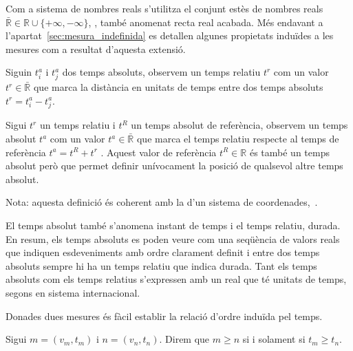 Com a sistema de nombres reals s'utilitza el conjunt estès de nombres reals $\bar{\mathbb{R}} \in \mathbb{R} \cup \{+\infty,-\infty\}$, \cite{wiki:extendedreal,cantrell:extendedreal}, també anomenat recta real acabada. Més endavant a l'apartat~\ref{sec:mesura_indefinida} es detallen algunes propietats induïdes a les mesures com a resultat d'aquesta extensió.

\begin{definition}[Temps]
  \label{def:temps}
  Siguin $t^a_i$ i $t^a_j$ dos temps absoluts, observem un temps
  relatiu $t^r$ com un valor $t^r \in\bar{\mathbb{R}}$ que marca la
  distància en unitats de temps entre dos temps absoluts $t^r = t^a_i
  - t^a_j$.
  
  Sigui $t^r$ un temps relatiu i $t^{R}$ un temps absolut de
  referència, observem un temps absolut $t^a$ com un valor $t^a
  \in\bar{\mathbb{R}}$ que marca el temps relatiu respecte al temps de
  referència $t^a= t^{R} + t^r$ . Aquest valor de referència
  $t^{R}\in\mathbb{R}$ és també un temps absolut però que permet
  definir unívocament la posició de qualsevol altre temps absolut.

  Nota: aquesta definició és coherent amb la d'un sistema de coordenades,~\cite{wiki:coordinate}. 

\end{definition}

El temps absolut també s'anomena instant de temps i el temps relatiu, durada.
En resum, els temps absoluts es poden veure com una seqüència de valors reals que indiquen esdeveniments amb ordre clarament definit i entre dos temps absoluts sempre hi ha un temps relatiu que indica durada. Tant els temps absoluts com els temps relatius s'expressen amb un real que té unitats de temps, segons en sistema internacional. 





Donades dues mesures és fàcil establir la relació d'ordre induïda pel
temps.

\begin{definition}
  \label{def:relacio-ordre}
  Sigui $m=(v_m,t_m)$ i $n=(v_n,t_n)$. Direm que $m\geq n$ si i solament
  si $t_m\geq t_n$.
\end{definition}


